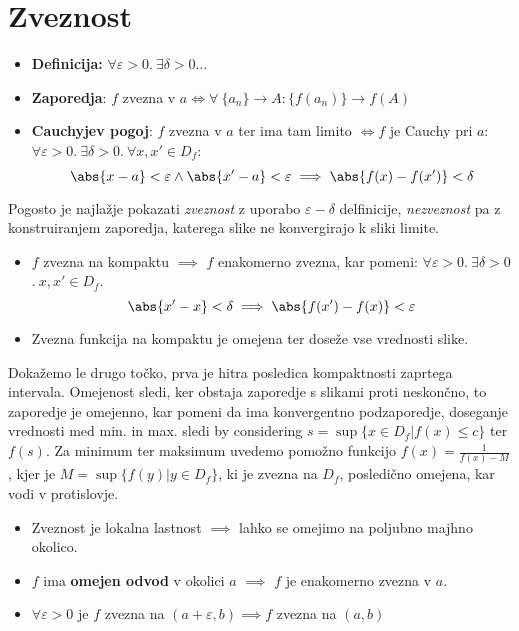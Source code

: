 \documentclass[12pt, a4paper, unicode]{article}
\newcommand{\ed}{\forall \varepsilon >0$.$\: \exists \delta>0$.$\:}
\begin{document}
\newpage
\section{Zveznost}
\begin{nasvet}
\begin{itemize}
    \item \textbf{Definicija:} $\forall \varepsilon >0$.$\: \exists \delta>0 \dots$ 
    \item \textbf{Zaporedja}: $f$ zvezna v $a \iff \forall \: \{a_n\} \xrightarrow{} A : \{f(a_n)\} \xrightarrow{} f(A)$
    \item \textbf{Cauchyjev pogoj}: $f$ zvezna v $a$ ter ima tam limito $\iff f$ je Cauchy pri $a$: \newline $\forall \varepsilon >0$.$\: \exists \delta>0$.$\: \forall x,x' \in D_f :$
    $$\abs{x-a} < \varepsilon \land \abs{x' - a} < \varepsilon \implies \abs{f(x) - f(x')} < \delta$$
\end{itemize}
\end{nasvet}

Pogosto je najlažje pokazati \textit{zveznost} z uporabo $\varepsilon - \delta$ delfinicije, \textit{nezveznost} pa z konstruiranjem zaporedja, katerega slike ne konvergirajo k sliki limite.

\begin{nasvet}
\begin{itemize}
    \item $f$ zvezna na kompaktu $\implies$ $f$ enakomerno zvezna, kar pomeni: \newline $\ed x,x' \in D_f$.$$\abs{x' - x} < \delta \implies \abs{f(x') - f(x)} < \varepsilon$$
    \item Zvezna funkcija na kompaktu je omejena ter doseže vse vrednosti slike.
\end{itemize}
\end{nasvet}
\begin{oris}
Dokažemo le drugo točko, prva je hitra posledica kompaktnosti zaprtega intervala. 
Omejenost sledi, ker obstaja zaporedje s slikami proti neskončno, to zaporedje je omejenno, kar pomeni da ima konvergentno podzaporedje, doseganje vrednosti med min. in max. sledi by considering $s = \sup\{x \in D_f | f(x) \leq c\}$ ter $f(s)$. Za minimum ter maksimum uvedemo pomožno funkcijo $f(x) = \frac{1}{f(x) - M}$, kjer je $M = \sup\{f(y) | y \in D_f\}$, ki je zvezna na $D_f$, posledično omejena, kar vodi v protislovje.
\end{oris}
\begin{nasvet}
\begin{itemize}
    \item Zveznost je lokalna lastnost $\implies$ lahko se omejimo na poljubno majhno okolico.
    \item $f$ ima \textbf{omejen odvod} v okolici $a$ $\implies$ $f$ je enakomerno zvezna v $a$.
    \item $\forall \varepsilon > 0$ je $f$ zvezna na $(a + \varepsilon, b) \implies f$ zvezna na $(a, b)$ 
\end{itemize}
\end{nasvet}
\end{document}
